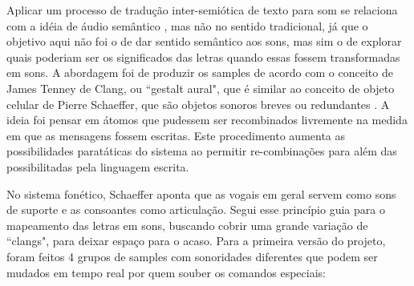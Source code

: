Aplicar um processo de tradução inter-semiótica de texto para som se relaciona com a idéia de áudio semântico \cite{Kostek:2010}, mas não no sentido tradicional, já que o objetivo aqui não foi o de dar sentido semântico aos sons, mas sim o de explorar quais poderiam ser os significados das letras quando essas fossem transformadas em sons. A abordagem foi de produzir os samples de acordo com o conceito de James Tenney \cite{Tenney1988} de Clang, ou ``gestalt aural", que é similar ao conceito de objeto celular de Pierre Schaeffer, que são objetos sonoros breves ou redundantes \cite{Chion1983}. A ideia foi pensar em átomos que pudessem ser recombinados livremente na medida em que as mensagens fossem escritas. Este procedimento aumenta as possibilidades paratáticas do sistema ao permitir re-combinações para além das possibilitadas pela linguagem escrita.


No sistema fonético, Schaeffer \cite{Schaeffer2007} aponta que as vogais em geral servem como sons de suporte e as consoantes como articulação. Segui esse princípio guia para o mapeamento das letras em sons, buscando cobrir uma grande variação de ``clangs", para deixar espaço para o acaso. Para a primeira versão do projeto, foram feitos 4 grupos de samples com sonoridades diferentes que podem ser mudados em tempo real por quem souber os comandos especiais: 

